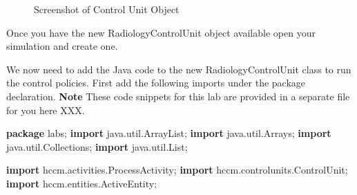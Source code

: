 \documentclass[
  10pt,
  a4paperpaper,
  DIV=11,
  numbers=noendperiod,
  oneside]{scrreprt}
\newenvironment{Shaded}{\begin{snugshade}}{\end{snugshade}}
\newcommand{\ImportTok}[1]{\textcolor[rgb]{0.00,0.46,0.62}{#1}}
\newcommand{\KeywordTok}[1]{\textcolor[rgb]{0.00,0.23,0.31}{\textbf{#1}}}
\newcommand{\OperatorTok}[1]{\textcolor[rgb]{0.37,0.37,0.37}{#1}}
\begin{document}
\begin{figure}[htbp]


\caption{\label{fig-cu_obj}Screenshot of Control Unit Object}

\end{figure}%

Once you have the new RadiologyControlUnit object available open your
simulation and create one.

We now need to add the Java code to the new RadiologyControlUnit class
to run the control policies. First add the following imports under the
package declaration. \textbf{Note} These code snippets for this lab are
provided in a separate file for you here XXX.

\begin{Shaded}
\begin{Highlighting}[numbers=left,,]
\KeywordTok{package}\ImportTok{ labs}\OperatorTok{;}
\KeywordTok{import} \ImportTok{java}\OperatorTok{.}\ImportTok{util}\OperatorTok{.}\ImportTok{ArrayList}\OperatorTok{;}
\KeywordTok{import} \ImportTok{java}\OperatorTok{.}\ImportTok{util}\OperatorTok{.}\ImportTok{Arrays}\OperatorTok{;}
\KeywordTok{import} \ImportTok{java}\OperatorTok{.}\ImportTok{util}\OperatorTok{.}\ImportTok{Collections}\OperatorTok{;}
\KeywordTok{import} \ImportTok{java}\OperatorTok{.}\ImportTok{util}\OperatorTok{.}\ImportTok{List}\OperatorTok{;}

\KeywordTok{import} \ImportTok{hccm}\OperatorTok{.}\ImportTok{activities}\OperatorTok{.}\ImportTok{ProcessActivity}\OperatorTok{;}
\KeywordTok{import} \ImportTok{hccm}\OperatorTok{.}\ImportTok{controlunits}\OperatorTok{.}\ImportTok{ControlUnit}\OperatorTok{;}
\KeywordTok{import} \ImportTok{hccm}\OperatorTok{.}\ImportTok{entities}\OperatorTok{.}\ImportTok{ActiveEntity}\OperatorTok{;}
\end{Highlighting}
\end{Shaded}
\end{document}
